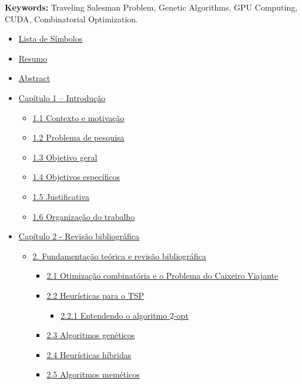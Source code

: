 \textbf{Keywords:} Traveling Salesman Problem, Genetic Algorithms, GPU
Computing, CUDA, Combinatorial Optimization.

\begin{itemize}
\tightlist
\item
  \hyperref[lista-de-simbolos]{Lista de Símbolos}
\item
  \hyperref[resumo]{Resumo}
\item
  \hyperref[abstract]{Abstract}
\item
  \hyperref[cap1-introducao]{Capítulo 1 -- Introdução}

  \begin{itemize}
  \tightlist
  \item
    \hyperref[sec-11-contexto-e-motivacao]{1.1 Contexto e motivação}
  \item
    \hyperref[sec-12-problema-de-pesquisa]{1.2 Problema de pesquisa}
  \item
    \hyperref[sec-13-objetivo-geral]{1.3 Objetivo geral}
  \item
    \hyperref[sec-14-objetivos-especificos]{1.4 Objetivos específicos}
  \item
    \hyperref[sec-15-justificativa]{1.5 Justificativa}
  \item
    \hyperref[sec-16-organizacao]{1.6 Organização do trabalho}
  \end{itemize}
\item
  \hyperref[cap2-revisao-bibliografica]{Capítulo 2 - Revisão
  bibliográfica}

  \begin{itemize}
  \tightlist
  \item
    \hyperref[sec-2-fundamentacao-e-revisao]{2. Fundamentação teórica e
    revisão bibliográfica}

    \begin{itemize}
    \tightlist
    \item
      \hyperref[sec-21-otimizacao-tsp]{2.1 Otimização combinatória e o
      Problema do Caixeiro Viajante}
    \item
      \hyperref[sec-22-heuristicas-tsp]{2.2 Heurísticas para o TSP}

      \begin{itemize}
      \tightlist
      \item
        \hyperref[sec-221-2opt]{2.2.1 Entendendo o algoritmo \(2\)-opt}
      \end{itemize}
    \item
      \hyperref[sec-23-algoritmos-geneticos]{2.3 Algoritmos genéticos}
    \item
      \hyperref[sec-24-heuristicas-hibridas]{2.4 Heurísticas híbridas}
    \item
      \hyperref[sec-25-algoritmos-memeticos]{2.5 Algoritmos meméticos}


\end{itemize}
\end{itemize}
\end{itemize}
